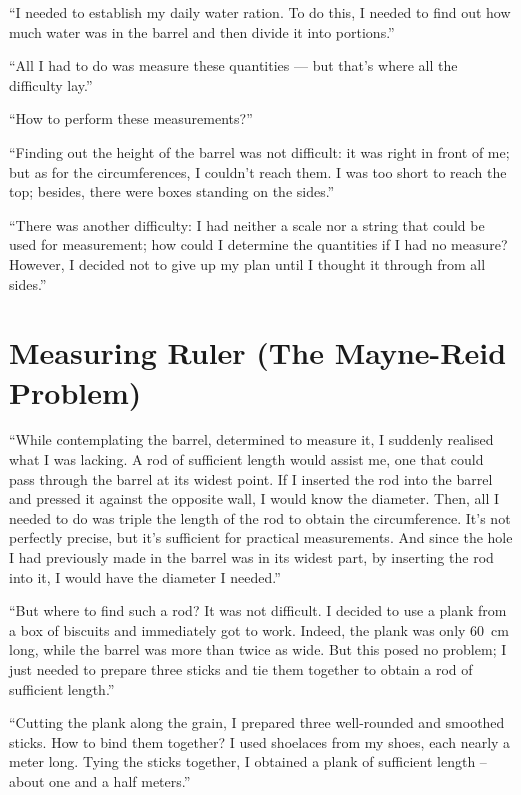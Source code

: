 ``I needed to establish my daily water ration. To do this, I needed to find out how much water was in the barrel and then divide it into portions.''

``All I had to do was measure these quantities — but that's where all the difficulty lay.''

``How to perform these measurements?''

``Finding out the height of the barrel was not difficult: it was right in front of me; but as for the circumferences, I couldn't reach them. I was too short to reach the top; besides, there were boxes standing on the sides.''

``There was another difficulty: I had neither a scale nor a string that could be used for measurement; how could I determine the quantities if I had no measure? However, I decided not to give up my plan until I thought it through from all sides.''

\section{Measuring Ruler (The Mayne-Reid Problem)}
\label{sec-8.3}

``While contemplating the barrel, determined to measure it, I suddenly realised what I was lacking. A rod of sufficient length would assist me, one that could pass through the barrel at its widest point. If I inserted the rod into the barrel and pressed it against the opposite wall, I would know the diameter. Then, all I needed to do was triple the length of the rod to obtain the circumference. It's not perfectly precise, but it's sufficient for practical measurements. And since the hole I had previously made in the barrel was in its widest part, by inserting the rod into it, I would have the diameter I needed.''

``But where to find such a rod? It was not difficult. I decided to use a plank from a box of biscuits and immediately got to work. Indeed, the plank was only \SI{60}{\centi\meter} long, while the barrel was more than twice as wide. But this posed no problem; I just needed to prepare three sticks and tie them together to obtain a rod of sufficient length.''

``Cutting the plank along the grain, I prepared three well-rounded and smoothed sticks. How to bind them together? I used shoelaces from my shoes, each nearly a meter long. Tying the sticks together, I obtained a plank of sufficient length -- about one and a half meters.''

